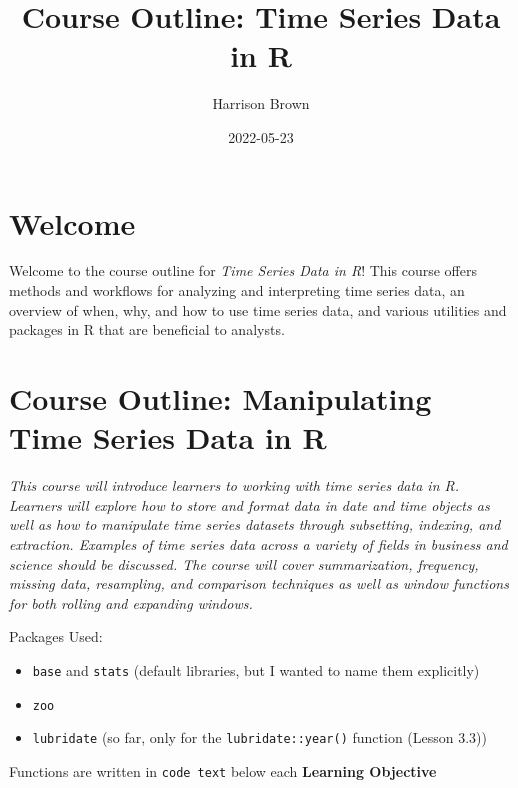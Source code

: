 \documentclass[
]{book}
\title{Course Outline: Time Series Data in R}
\author{Harrison Brown}
\date{2022-05-23}
\providecommand{\tightlist}{%
  \setlength{\itemsep}{0pt}\setlength{\parskip}{0pt}}
\begin{document}
\maketitle

{
\setcounter{tocdepth}{1}
\tableofcontents
}
\hypertarget{welcome}{%
\chapter*{Welcome}\label{welcome}}

Welcome to the course outline for \emph{Time Series Data in R}! This course offers methods and workflows for analyzing and interpreting time series data, an overview of when, why, and how to use time series data, and various utilities and packages in R that are beneficial to analysts.

\hypertarget{course-outline-manipulating-time-series-data-in-r}{%
\chapter*{Course Outline: Manipulating Time Series Data in R}\label{course-outline-manipulating-time-series-data-in-r}}

\emph{This course will introduce learners to working with time series data in R. Learners will explore how to store and format data in date and time objects as well as how to manipulate time series datasets through subsetting, indexing, and extraction. Examples of time series data across a variety of fields in business and science should be discussed. The course will cover summarization, frequency, missing data, resampling, and comparison techniques as well as window functions for both rolling and expanding windows.}

Packages Used:

\begin{itemize}
\tightlist
\item
  \texttt{base} and \texttt{stats} (default libraries, but I wanted to name them explicitly)
\item
  \texttt{zoo}
\item
  \texttt{lubridate} (so far, only for the \texttt{lubridate::year()} function (Lesson 3.3))
\end{itemize}

Functions are written in \texttt{code\ text} below each \textbf{Learning Objective}
\end{document}
